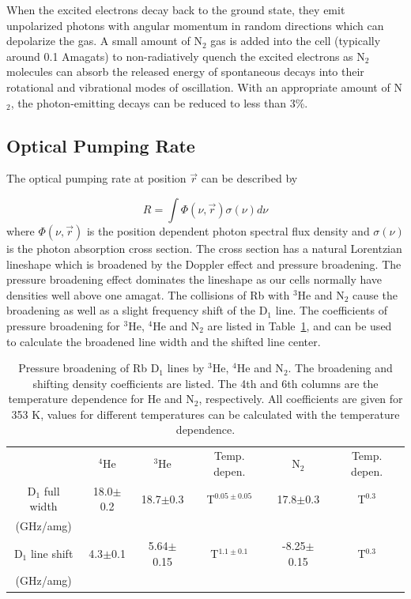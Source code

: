 When the excited electrons decay back to the ground state, they emit unpolarized photons with angular momentum in random directions which can depolarize the gas. A small amount of N$_{2}$ gas is added into the cell (typically around 0.1 Amagats) to non-radiatively quench the excited electrons as N$_{2}$ molecules can absorb the released energy of spontaneous decays into their rotational and vibrational modes of oscillation. With an appropriate amount of N$_{2}$\cite{Wagshul}, the photon-emitting decays can be reduced to less than 3\%.

\subsection{Optical Pumping Rate}

The optical pumping rate at position $\vec{r}$ can be described by

\begin{equation}
R = \int \Phi(\nu, \vec{r})\sigma(\nu)d\nu
\end{equation}
where $\Phi(\nu,\vec{r})$ is the position dependent photon spectral flux density and $\sigma(\nu)$ is the photon absorption cross section. The cross section has a natural Lorentzian lineshape which is broadened by the Doppler effect and pressure broadening. The pressure broadening effect dominates the lineshape as our cells normally have densities well above one amagat. The collisions of Rb with $^{3}$He and N$_{2}$ cause the broadening as well as a slight frequency shift of the D$_{1}$ line. The coefficients of pressure broadening for $^{3}$He, $^{4}$He and N$_{2}$ are listed in Table~\ref{PBCoef}, and can be used to calculate the broadened line width and the shifted line center.

\begin{table}[t!]
	\begin{center}
		\caption{ Pressure broadening of Rb D$_{1}$ lines by $^{3}$He, $^{4}$He and N$_{2}$. The broadening and shifting density coefficients are listed. The 4th and 6th columns are the temperature dependence for He and N$_{2}$, respectively. All coefficients are given for 353 K, values for different temperatures can be calculated with the temperature dependence.}
		\label{PBCoef}
		\begin{tabular}{ c c c c c c}
			\hline \hline
			& $^{4}$He & $^{3}$He & Temp. depen. & N$_{2}$ & Temp. depen.\\ 
			D$_{1}$ full width & 18.0$\pm$0.2 & 18.7$\pm$0.3 & T$^{0.05\pm0.05}$ & 17.8$\pm$0.3 & T$^{0.3}$\\ 
			(GHz/amg) &&&&& \\
			D$_{1}$ line shift & 4.3$\pm$0.1 & 5.64$\pm$0.15 & T$^{1.1\pm0.1}$ &
			-8.25$\pm$0.15 & T$^{0.3}$ \\ 
			(GHz/amg) &&&&& \\ \hline \hline
		\end{tabular}
	\end{center}
\end{table}

